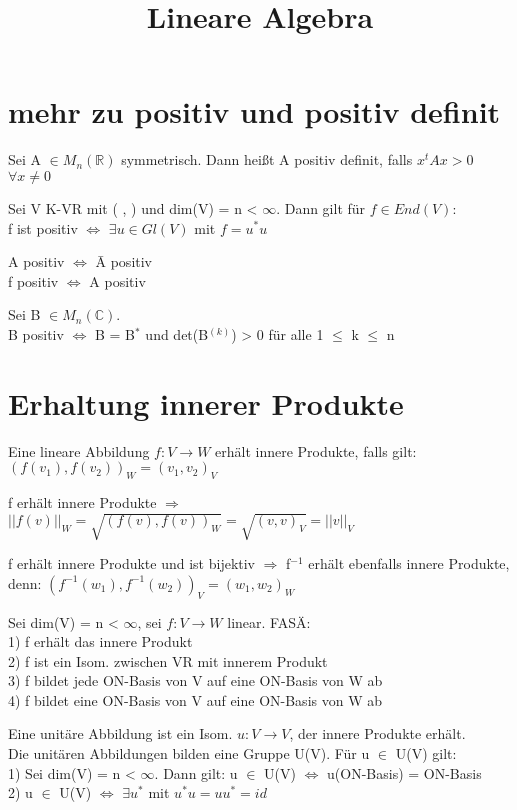 \documentclass[fontsize=10pt]{scrartcl}
\title{Lineare Algebra}
\author{}
\date{}
\begin{document}

\maketitle

\section{mehr zu positiv und positiv definit}
\begin{compactitem}
\item Sei A $\in M_n(\mathbb{R})$ symmetrisch. Dann heißt A positiv definit, falls $x^tAx > 0$ $\forall x \neq 0$
\item Sei V K-VR mit ( , ) und dim(V) = n < $\infty$. Dann gilt für $f \in End(V)$:\\
f ist positiv $\Leftrightarrow$ $\exists u \in Gl(V)$ mit $f = u^*u$
\item A positiv $\Leftrightarrow$ \={A} positiv\\
f positiv $\Leftrightarrow$ A positiv
\item Sei B $\in M_n(\mathbb{C})$.\\
B positiv $\Leftrightarrow$ B = B$^*$ und det(B$^{(k)}$) > 0 für alle 1 $\le$ k $\le$ n
\end{compactitem}

\section{Erhaltung innerer Produkte}
\begin{compactitem}
\item Eine lineare Abbildung $f: V \to W$ erhält innere Produkte, falls gilt: $(f(v_1), f(v_2))_W = (v_1, v_2)_V$
\item f erhält innere Produkte $\Rightarrow$ $||f(v)||_W = \sqrt{(f(v), f(v))_W} = \sqrt{(v,v)_V} = ||v||_V$
\item f erhält innere Produkte und ist bijektiv $\Rightarrow$ f$^{-1}$ erhält ebenfalls innere Produkte, denn: $(f^{-1}(w_1), f^{-1}(w_2))_V = (w_1, w_2)_W$
\item Sei dim(V) = n < $\infty$, sei $f: V \to W$ linear. FASÄ:\\
1) f erhält das innere Produkt\\
2) f ist ein Isom. zwischen VR mit innerem Produkt\\
3) f bildet jede ON-Basis von V auf eine ON-Basis von W ab\\
4) f bildet eine ON-Basis von V auf eine ON-Basis von W ab
\item Eine unitäre Abbildung ist ein Isom. $u: V \to V$, der innere Produkte erhält.\\
Die unitären Abbildungen bilden eine Gruppe U(V). Für u $\in$ U(V) gilt:\\
1) Sei dim(V) = n < $\infty$. Dann gilt: u $\in$ U(V) $\Leftrightarrow$ u(ON-Basis) = ON-Basis\\
2) u $\in$ U(V) $\Leftrightarrow$ $\exists u^*$ mit $u^*u=uu^*=id$
\end{compactitem}
\end{document}
